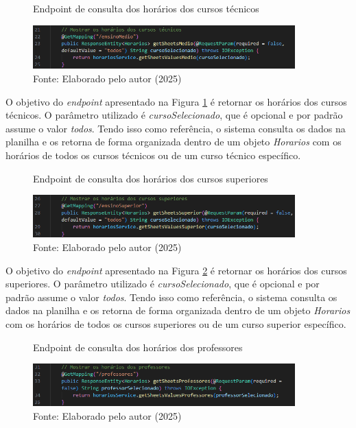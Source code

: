 \begin{itemize}
    \begin{figure}[htb]
        \centering
        \caption{Endpoint de consulta dos horários dos cursos técnicos}
        \includegraphics[width=0.9\textwidth]{Figuras/back-3.png}
        \caption*{Fonte: Elaborado pelo autor (2025)}
        \label{fig_back_3}
    \end{figure}

    O objetivo do \textit{endpoint} apresentado na Figura \ref{fig_back_3} é retornar os horários dos cursos técnicos. O parâmetro utilizado é \textit{cursoSelecionado}, que é opcional e por padrão assume o valor \textit{todos}. Tendo isso como referência, o sistema consulta os dados na planilha e os retorna de forma organizada dentro de um objeto \textit{Horarios} com os horários de todos os cursos técnicos ou de um curso técnico específico.

    \begin{figure}[htb]
        \centering
        \caption{Endpoint de consulta dos horários dos cursos superiores}
        \includegraphics[width=0.9\textwidth]{Figuras/back-4.png}
        \caption*{Fonte: Elaborado pelo autor (2025)}
        \label{fig_back_4}
    \end{figure}

    O objetivo do \textit{endpoint} apresentado na Figura \ref{fig_back_4} é retornar os horários dos cursos superiores. O parâmetro utilizado é \textit{cursoSelecionado}, que é opcional e por padrão assume o valor \textit{todos}. Tendo isso como referência, o sistema consulta os dados na planilha e os retorna de forma organizada dentro de um objeto \textit{Horarios} com os horários de todos os cursos superiores ou de um curso superior específico.

    \begin{figure}[htb]
        \centering
        \caption{Endpoint de consulta dos horários dos professores}
        \includegraphics[width=0.9\textwidth]{Figuras/back-5.png}
        \caption*{Fonte: Elaborado pelo autor (2025)}
        \label{fig_back_5}
    \end{figure}


\end{itemize}
